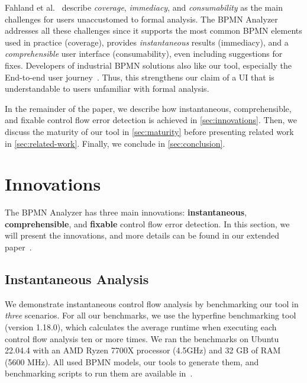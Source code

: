 \documentclass[
onecolumn, %
]{ceurart}
\begin{document}
Fahland et al.~\cite{fahlandAnalysisDemandInstantaneous2011} describe \textit{coverage}, \textit{immediacy}, and \textit{consumability} as the main challenges for users unaccustomed to formal analysis.
The BPMN Analyzer addresses all these challenges since it supports the most common BPMN elements used in practice (coverage), provides \textit{instantaneous} results (immediacy), and a \textit{comprehensible} user interface (consumability), even including suggestions for fixes.
Developers of industrial BPMN solutions also like our tool, especially the End-to-end user journey~\cite{krauterInstantaneousComprehensibleFixable2024}.
Thus, this strengthens our claim of a UI that is understandable to users unfamiliar with formal analysis.

In the remainder of the paper, we describe how instantaneous, comprehensible, and fixable control flow error detection is achieved in \autoref{sec:innovations}.
Then, we discuss the maturity of our tool in \autoref{sec:maturity} before presenting related work in \autoref{sec:related-work}.
Finally, we conclude in \autoref{sec:conclusion}.

\section{Innovations} \label{sec:innovations} %
The BPMN Analyzer has three main innovations: \textbf{instantaneous}, \textbf{comprehensible}, and \textbf{fixable} control flow error detection.
In this section, we will present the innovations, and more details can be found in our extended paper~\cite{krauterInstantaneousComprehensibleFixable2024}.

\subsection{Instantaneous Analysis}

We demonstrate instantaneous control flow analysis by benchmarking our tool in \textit{three} scenarios.
For all our benchmarks, we use the hyperfine benchmarking tool (version 1.18.0), which calculates the average runtime when executing each control flow analysis ten or more times.
We ran the benchmarks on Ubuntu 22.04.4 with an AMD Ryzen 7700X processor (4.5GHz) and 32 GB of RAM (5600 MHz).
All used BPMN models, our tools to generate them, and benchmarking scripts to run them are available in~\cite{krauterInstantaneousComprehensibleFixable2024}.
\end{document}
